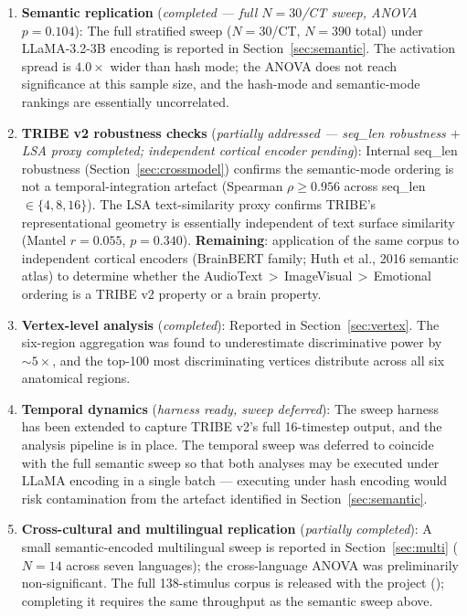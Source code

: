 \documentclass[11pt,letterpaper]{article}
\numberwithin{equation}{section}
\begin{document}
\begin{enumerate}[leftmargin=1.4em,itemsep=3pt,topsep=2pt]
\item \textbf{Semantic replication} (\textit{completed --- full $N=30$/CT sweep, ANOVA $p=0.104$}): The full stratified sweep ($N=30$/CT, $N=390$ total) under LLaMA-3.2-3B encoding is reported in Section~\ref{sec:semantic}. The activation spread is $4.0\times$ wider than hash mode; the ANOVA does not reach significance at this sample size, and the hash-mode and semantic-mode rankings are essentially uncorrelated.
\item \textbf{TRIBE v2 robustness checks} (\textit{partially addressed --- seq\_len robustness $+$ LSA proxy completed; independent cortical encoder pending}): Internal seq\_len robustness (Section~\ref{sec:crossmodel}) confirms the semantic-mode ordering is not a temporal-integration artefact (Spearman $\rho \geq 0.956$ across seq\_len $\in \{4, 8, 16\}$). The LSA text-similarity proxy confirms TRIBE's representational geometry is essentially independent of text surface similarity (Mantel $r = 0.055$, $p = 0.340$). \textbf{Remaining}: application of the same corpus to independent cortical encoders (BrainBERT family; Huth et al., 2016 semantic atlas) to determine whether the AudioText\,$>$\,ImageVisual\,$>$\,Emotional ordering is a TRIBE v2 property or a brain property.
\item \textbf{Vertex-level analysis} (\textit{completed}): Reported in Section~\ref{sec:vertex}. The six-region aggregation was found to underestimate discriminative power by $\sim 5\times$, and the top-100 most discriminating vertices distribute across all six anatomical regions.
\item \textbf{Temporal dynamics} (\textit{harness ready, sweep deferred}): The sweep harness has been extended to capture TRIBE v2's full 16-timestep output, and the analysis pipeline is in place. The temporal sweep was deferred to coincide with the full semantic sweep so that both analyses may be executed under LLaMA encoding in a single batch --- executing under hash encoding would risk contamination from the artefact identified in Section~\ref{sec:semantic}.
\item \textbf{Cross-cultural and multilingual replication} (\textit{partially completed}): A small semantic-encoded multilingual sweep is reported in Section~\ref{sec:multi} ($N=14$ across seven languages); the cross-language ANOVA was preliminarily non-significant. The full 138-stimulus corpus is released with the project (); completing it requires the same throughput as the semantic sweep above.
\end{enumerate}
\end{document}
